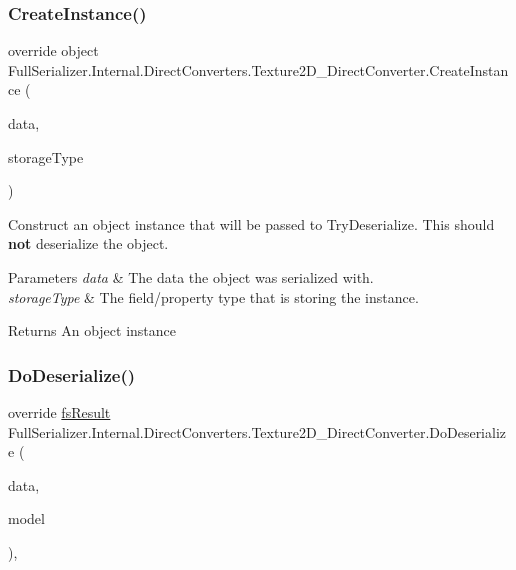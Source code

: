 \subsubsection{\texorpdfstring{Create\+Instance()}{CreateInstance()}}
{\footnotesize\ttfamily override object Full\+Serializer.\+Internal.\+Direct\+Converters.\+Texture2\+D\+\_\+\+Direct\+Converter.\+Create\+Instance (\begin{DoxyParamCaption}\item[{\hyperlink{class_full_serializer_1_1fs_data}{fs\+Data}}]{data,  }\item[{Type}]{storage\+Type }\end{DoxyParamCaption})\hspace{0.3cm}{\ttfamily [inline]}}



Construct an object instance that will be passed to Try\+Deserialize. This should {\bfseries not} deserialize the object. 


\begin{DoxyParams}{Parameters}
{\em data} & The data the object was serialized with.\\
\hline
{\em storage\+Type} & The field/property type that is storing the instance.\\
\hline
\end{DoxyParams}
\begin{DoxyReturn}{Returns}
An object instance
\end{DoxyReturn}
\mbox{\label{class_full_serializer_1_1_internal_1_1_direct_converters_1_1_texture2_d___direct_converter_ad806f06e5841f395ac5ab613255d8db4}} 
\subsubsection{\texorpdfstring{Do\+Deserialize()}{DoDeserialize()}}
{\footnotesize\ttfamily override \hyperlink{struct_full_serializer_1_1fs_result}{fs\+Result} Full\+Serializer.\+Internal.\+Direct\+Converters.\+Texture2\+D\+\_\+\+Direct\+Converter.\+Do\+Deserialize (\begin{DoxyParamCaption}\item[{Dictionary$<$ string, \hyperlink{class_full_serializer_1_1fs_data}{fs\+Data} $>$}]{data,  }\item[{ref Texture2D}]{model }\end{DoxyParamCaption})\hspace{0.3cm}{\ttfamily [inline]}, {\ttfamily [protected]}}



